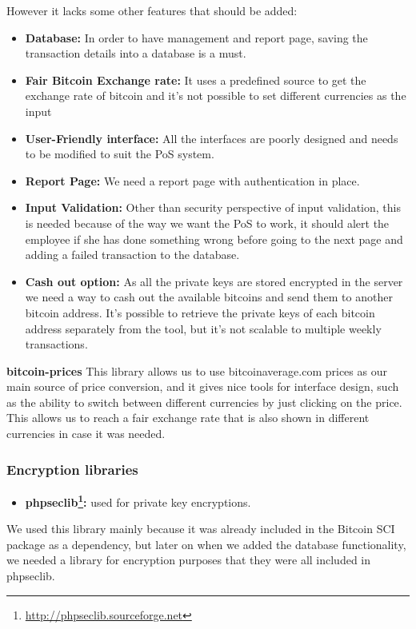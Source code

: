 However it lacks some other features that should be added:
\begin{itemize}

\item \textbf{Database: } In order to have management and report page, saving the transaction details into a database is a must.
\item \textbf{Fair Bitcoin Exchange rate: } It uses a predefined source to get the exchange rate of bitcoin and it's not possible to set different currencies as the input
\item \textbf{User-Friendly interface: } All the interfaces are poorly designed and needs to be modified to suit the PoS system.
\item \textbf {Report Page: } We need a report page with authentication in place.
\item \textbf {Input Validation: } Other than security perspective of input validation, this is needed because of the way we want the PoS to work, it should alert the employee if she has done something wrong before going to the next page and adding a failed transaction to the database.
\item \textbf {Cash out option: } As all the private keys are stored encrypted in the server we need a way to cash out the available bitcoins and send them to another bitcoin address. It's possible to retrieve the private keys of each bitcoin address separately from the tool, but it's not scalable to multiple weekly transactions.
\end{itemize}

\textbf{bitcoin-prices} This library allows us to use bitcoinaverage.com prices as our main source of price conversion, and it gives nice tools for interface design, such as the ability to switch between different currencies by just clicking on the price. This allows us to reach a fair exchange rate that is also shown in different currencies in case it was needed.

\subsubsection{Encryption libraries}
\begin{itemize}
\item \textbf{phpseclib\footnote{\url{http://phpseclib.sourceforge.net}}: } used for private key encryptions.
\end{itemize}

We used this library mainly because it was already included in the Bitcoin SCI package as a dependency, but later on when we added the database functionality, we needed a library for encryption purposes that they were all included in phpseclib.

